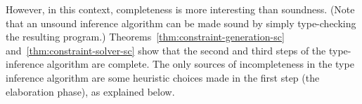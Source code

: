 
However, in this context, completeness is more interesting than soundness.
(Note that an unsound inference algorithm can be made sound by simply type-checking
the resulting program.)
Theorems~\ref{thm:constraint-generation-sc} and~\ref{thm:constraint-solver-sc}
show that the second and third steps of the type-inference algorithm are complete.
The only sources of incompleteness in the type inference algorithm are some heuristic
choices made in the first step (the elaboration phase), as explained below.

